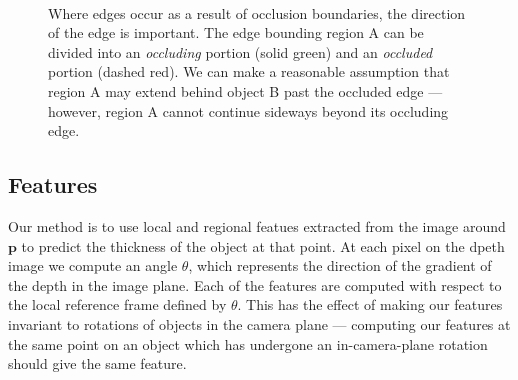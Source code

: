\documentclass[10pt,twocolumn,letterpaper]{article}
\newcommand{\point}{\mathbf{p}}
\begin{document}
\begin{figure}
    \centering 
        \hfill
     \\
    \caption{Where edges occur as a result of occlusion boundaries, the direction of the edge is important. The edge bounding region A can be divided into an \emph{occluding} portion (solid green) and an \emph{occluded} portion (dashed red).
    We can make a reasonable assumption that region A may extend behind object B past the occluded edge --- however, region A cannot continue sideways beyond its occluding edge.}
    \label{fig:occluded_region}
\end{figure}



\subsection{Features}
Our method is to use local and regional featues extracted from the image around $\point$ to predict the thickness of the object at that point.
At each pixel on the dpeth image we compute an angle $\theta$, which represents the direction of the gradient of the depth in the image plane.
Each of the features are computed with respect to the local reference frame defined by $\theta$.
This has the effect of making our features invariant to rotations of objects in the camera plane --- computing our features at the same point on an object which has undergone an in-camera-plane rotation should give the same feature.
\end{document}
